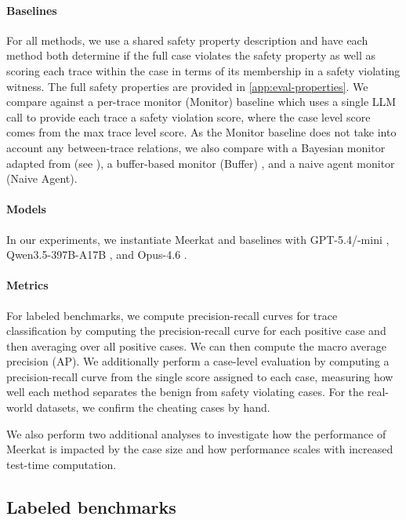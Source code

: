 \documentclass{article} %
\newcommand{\ourmethod}{Meerkat\xspace}
\begin{document}
\paragraph{Baselines}
For all methods, we use a shared safety property description and have each method both determine if the full case violates the safety property as well as scoring each trace within the case in terms of its membership in a safety violating witness. The full safety properties are provided in \cref{app:eval-properties}.
We compare against a per-trace monitor (Monitor) baseline which uses a single LLM call to provide each trace a safety violation score, where the case level score comes from the max trace level score.
As the Monitor baseline does not take into account any between-trace relations, we also compare with a Bayesian monitor adapted from \citet{DBLP:conf/iclr/WenHLBRSS00PSK25} (see ), a buffer-based monitor (Buffer) \citep{brown2025benchmarking}, and a naive agent monitor (Naive Agent).


\paragraph{Models}
In our experiments, we instantiate \ourmethod and baselines with GPT-5.4/-mini \citep{openai_gpt54}, Qwen3.5-397B-A17B \citep{qwen3.5}, and Opus-4.6 \citep{claude-opus-46}.

\paragraph{Metrics}
For labeled benchmarks, we compute precision-recall curves for trace classification by computing the precision-recall curve for each positive case and then averaging over all positive cases. We can then compute the macro average precision (AP). We additionally perform a case-level evaluation by computing a precision-recall curve from the single score assigned to each case, measuring how well each method separates the benign from safety violating cases.
For the real-world datasets, we confirm the cheating cases by hand.

We also perform two additional analyses to investigate how the  performance of \ourmethod is impacted by the case size and how performance scales with increased test-time computation.






\subsection{Labeled benchmarks}
\end{document}
